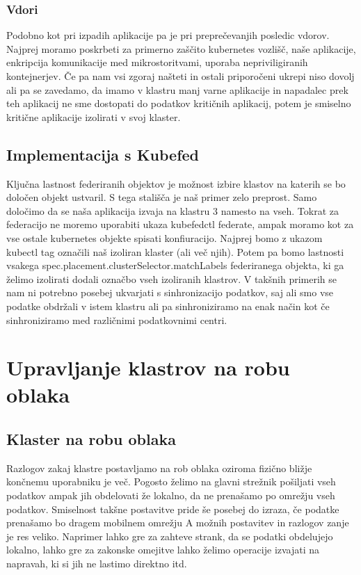 \documentclass[a4paper, 12pt]{book}
\begin{document}
\subsection{Vdori}
Podobno kot pri izpadih aplikacije pa je pri preprečevanjih posledic vdorov.
Najprej moramo poskrbeti za primerno zaščito kubernetes vozlišč, naše aplikacije, enkripcija komunikacije med mikrostoritvami, uporaba nepriviligiranih kontejnerjev.
Če pa nam vsi zgoraj našteti in ostali priporočeni ukrepi niso dovolj ali pa se zavedamo, da imamo v klastru manj varne aplikacije in napadalec prek teh aplikacij ne sme dostopati do podatkov kritičnih aplikacij, potem je smiselno kritične aplikacije izolirati v svoj klaster.
\section{Implementacija s Kubefed}
Ključna lastnost federiranih objektov je možnost izbire klastov na katerih se bo določen objekt ustvaril. 
S tega stališča je naš primer zelo preprost.
Samo določimo da se naša aplikacija izvaja na klastru 3 namesto na vseh.
Tokrat za federacijo ne moremo uporabiti ukaza kubefedctl federate, ampak moramo kot za vse ostale kubernetes objekte spisati konfiuracijo.
Najprej bomo z ukazom kubectl tag označili naš izoliran klaster (ali več njih).
Potem pa bomo lastnosti vsakega spec.placement.clusterSelector.matchLabels federiranega objekta, ki ga želimo izolirati dodali označbo vseh izoliranih klastrov.
V takšnih primerih se nam ni potrebno posebej ukvarjati s sinhronizacijo podatkov, saj ali smo vse podatke obdržali v istem klastru ali pa sinhroniziramo na enak način kot če sinhroniziramo med različnimi podatkovnimi centri.
\chapter{Upravljanje klastrov na robu oblaka}
\section{Klaster na robu oblaka}
Razlogov zakaj klastre postavljamo na rob oblaka oziroma fizično bližje končnemu uporabniku je več.
Pogosto želimo na glavni strežnik pošiljati vseh podatkov ampak jih obdelovati že lokalno, da ne prenašamo po omrežju vseh podatkov.
Smiselnost takšne postavitve pride še posebej do izraza, če podatke prenašamo bo dragem mobilnem omrežju
A možnih postavitev in razlogov zanje je res veliko.
Naprimer lahko gre za zahteve strank, da se podatki obdelujejo lokalno, lahko gre za zakonske omejitve lahko želimo operacije izvajati na napravah, ki si jih ne lastimo direktno itd.
\end{document}
